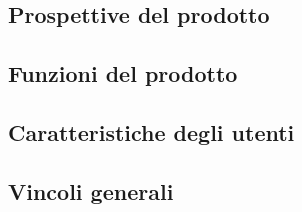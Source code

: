 \subsection{Prospettive del prodotto}

\subsection{Funzioni del prodotto}

\subsection{Caratteristiche degli utenti}

\subsection{Vincoli generali}


\pagebreak